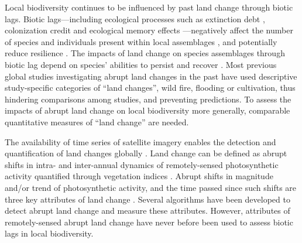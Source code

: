 Local biodiversity continues to be influenced by past land change through biotic lags. Biotic lags—including ecological processes such as extinction debt \citep{Tilman1994,Kuussaari2009,Halley2016}, colonization credit \citep{Hylander2013} and ecological memory effects \citep{Ogle2015}—negatively affect the number of species and individuals present within local assemblages \citep{Halley2016,Jung2018,Perring2018}, and potentially reduce resilience \citep{Hautier2015,Nimmo2015}. The impacts of land change on species assemblages through biotic lag depend on species’ abilities to persist \citep{Turner1998} and recover \citep{Martin2013,Fu2017,Moreno-Mateos2017}. Most previous global studies \citep{Supp2014,Fu2017,Moreno-Mateos2017,Shackelford2017} investigating abrupt land changes in the past have used descriptive study-specific categories of “land changes”, \eg wild fire, flooding or cultivation, thus hindering comparisons among studies, and preventing predictions. To assess the impacts of abrupt land change on local biodiversity more generally, comparable quantitative measures of “land change” are needed.

The availability of time series of satellite imagery enables the detection and quantification of land changes globally \citep{Kennedy2014,Song2018}. Land change can be defined as abrupt shifts in intra- and inter-annual dynamics of remotely-sensed photosynthetic activity quantified through vegetation indices \citep{Linderman2005,Pettorelli2005}. Abrupt shifts in magnitude \citep{Kennedy2012,Watson2014,DeVries2015b} and/or trend \citep{DeJong2013} of photosynthetic activity, and the time passed since such shifts \citep{POTTER2003,Kennedy2012} are three key attributes of land change \citep{Watson2014}. Several algorithms have been developed to detect abrupt land change \citep{Zhu2017} and measure these attributes. However, attributes of remotely-sensed abrupt land change have never before been used to assess biotic lags in local biodiversity.

